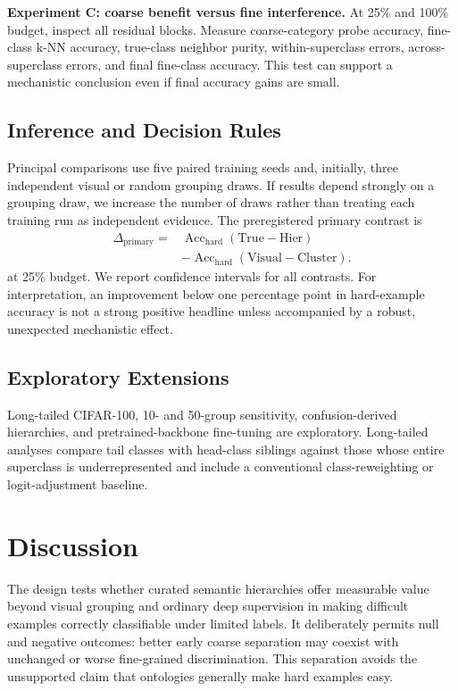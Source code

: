 \documentclass[conference]{IEEEtran}
\begin{document}
\textbf{Experiment C: coarse benefit versus fine interference.} At 25\% and 100\% budget, inspect all residual blocks. Measure coarse-category probe accuracy, fine-class k-NN accuracy, true-class neighbor purity, within-superclass errors, across-superclass errors, and final fine-class accuracy. This test can support a mechanistic conclusion even if final accuracy gains are small.

\subsection{Inference and Decision Rules}
Principal comparisons use five paired training seeds and, initially, three independent visual or random grouping draws. If results depend strongly on a grouping draw, we increase the number of draws rather than treating each training run as independent evidence. The preregistered primary contrast is
\begin{equation}
\begin{aligned}
\Delta_{\mathrm{primary}} ={}& \operatorname{Acc}_{\mathrm{hard}}(\mathrm{True\! -\!Hier})\\
&-\operatorname{Acc}_{\mathrm{hard}}(\mathrm{Visual\! -\!Cluster}).
\end{aligned}
\end{equation}
at 25\% budget. We report confidence intervals for all contrasts. For interpretation, an improvement below one percentage point in hard-example accuracy is not a strong positive headline unless accompanied by a robust, unexpected mechanistic effect.

\subsection{Exploratory Extensions}
Long-tailed CIFAR-100, 10- and 50-group sensitivity, confusion-derived hierarchies, and pretrained-backbone fine-tuning are exploratory. Long-tailed analyses compare tail classes with head-class siblings against those whose entire superclass is underrepresented and include a conventional class-reweighting or logit-adjustment baseline.

\section{Discussion}
The design tests whether curated semantic hierarchies offer measurable value beyond visual grouping and ordinary deep supervision in making difficult examples correctly classifiable under limited labels. It deliberately permits null and negative outcomes: better early coarse separation may coexist with unchanged or worse fine-grained discrimination. This separation avoids the unsupported claim that ontologies generally make hard examples easy.
\end{document}

